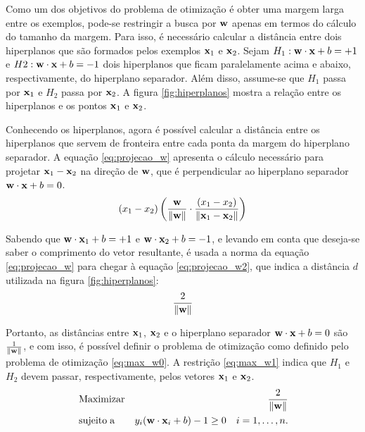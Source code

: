Como um dos objetivos do problema de otimização é obter uma margem larga entre os exemplos, pode-se restringir a busca por $\mathbf{w}$ apenas em termos do cálculo do tamanho da margem. Para isso, é necessário calcular a distância entre dois hiperplanos que são formados pelos exemplos $\mathbf{x}_1$ e $\mathbf{x}_2$. Sejam $H_1: \mathbf{w}\cdot\mathbf{x} + b = +1$ e $H2: \mathbf{w}\cdot\mathbf{x} +b = -1$ dois hiperplanos que ficam paralelamente acima e abaixo, respectivamente, do hiperplano separador. Além disso, assume-se que $H_1$ passa por $\mathbf{x}_1$ e $H_2$ passa por $\mathbf{x}_2$. A figura \ref{fig:hiperplanos} mostra a relação entre os hiperplanos e os pontos $\mathbf{x}_1$ e $\mathbf{x}_2$.

Conhecendo os hiperplanos, agora é possível calcular a distância entre os hiperplanos que servem de fronteira entre cada ponta da margem do hiperplano separador. A equação \ref{eq:projecao_w} apresenta o cálculo necessário para projetar $\mathbf{x}_1 - \mathbf{x}_2$ na direção de $\mathbf{w}$, que é perpendicular ao hiperplano separador $\mathbf{w}\cdot\mathbf{x} + b = 0$.
\begin{equation}\label{eq:projecao_w}
  (x_1 - x_2)
    \left(
      \frac{ \mathbf{w} }{ \lVert \mathbf{w} \rVert }
      \cdot
      \frac{(x_1 - x_2)}{ \lVert \mathbf{x}_1 - \mathbf{x}_2 \rVert }
    \right)
\end{equation}

Sabendo que $\mathbf{w}\cdot\mathbf{x}_1 + b = +1$ e $\mathbf{w}\cdot\mathbf{x}_2 + b = -1$, e levando em conta que deseja-se saber o comprimento do vetor resultante, é usada a norma da equação \ref{eq:projecao_w} para chegar à equação \ref{eq:projecao_w2}, que indica a distância $d$ utilizada na figura \ref{fig:hiperplanos}:
\begin{equation}\label{eq:projecao_w2}
  \frac{2}{\lVert \mathbf{w} \rVert}
\end{equation}

Portanto, as distâncias entre $\mathbf{x}_1$, $\mathbf{x}_2$ e o hiperplano separador $\mathbf{w}\cdot\mathbf{x} + b = 0$ são $\frac{1}{\lVert \mathbf{w} \rVert}$, e com isso, é possível definir o problema de otimização como definido pelo problema de otimização \ref{eq:max_w0}. A restrição \ref{eq:max_w1} indica que $H_1$ e $H_2$ devem passar, respectivamente, pelos vetores $\mathbf{x}_1$ e $\mathbf{x}_2$.
\begin{eqnarray}
& \label{eq:max_w0}\operatorname{Maximizar} & \frac{2}{\lVert \mathbf{w} \rVert} \\
& \label{eq:max_w1} \operatorname{sujeito\;a} & y_i(\mathbf{w}\cdot\mathbf{x}_i + b) - 1 \ge 0 \quad i = 1,\dotsc,n.
\end{eqnarray}

